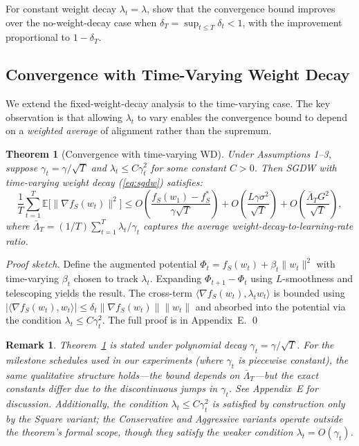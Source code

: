 \documentclass{article}
\newtheorem{theorem}{Theorem}
\newtheorem{remark}{Remark}
\begin{document}
For constant weight decay $\lambda_t = \lambda$, \citet{xie2024investigating} show
that the convergence bound improves over the no-weight-decay case when
$\delta_T = \sup_{t \leq T} \delta_t < 1$, with the improvement proportional to
$1 - \delta_T$.

\subsection{Convergence with Time-Varying Weight Decay}

We extend the fixed-weight-decay analysis to the time-varying case.
The key observation is that allowing $\lambda_t$ to vary enables the convergence
bound to depend on a \emph{weighted average} of alignment rather than the supremum.

\begin{theorem}[Convergence with time-varying WD]
  \label{thm:convergence}
  Under Assumptions 1--3, suppose $\gamma_t = \gamma / \sqrt{T}$ and
  $\lambda_t \leq C\gamma_t^2$ for some constant $C > 0$.
  Then SGDW with time-varying weight decay (\ref{eq:sgdw}) satisfies:
  \begin{equation}
    \frac{1}{T}\sum_{t=1}^{T} \mathbb{E}\bigl[\|\nabla f_S(w_t)\|^2\bigr]
    \leq O\!\left(\frac{f_S(w_1) - f_S^*}{\gamma\sqrt{T}}\right)
       + O\!\left(\frac{L\gamma\sigma^2}{\sqrt{T}}\right)
       + O\!\left(\frac{\bar{\Lambda}_T G^2}{\sqrt{T}}\right),
  \end{equation}
  where $\bar{\Lambda}_T = (1/T)\sum_{t=1}^{T} \lambda_t / \gamma_t$ captures the
  average weight-decay-to-learning-rate ratio.
\end{theorem}

\emph{Proof sketch.}
Define the augmented potential $\Phi_t = f_S(w_t) + \beta_t \|w_t\|^2$ with
time-varying $\beta_t$ chosen to track $\lambda_t$.
Expanding $\Phi_{t+1} - \Phi_t$ using $L$-smoothness and telescoping yields the
result.
The cross-term $\langle \nabla f_S(w_t), \lambda_t w_t \rangle$ is bounded using
$|\langle \nabla f_S(w_t), w_t \rangle| \leq \delta_t \|\nabla f_S(w_t)\| \|w_t\|$
and absorbed into the potential via the condition $\lambda_t \leq C\gamma_t^2$.
The full proof is in Appendix~E. \qed

\begin{remark}
  Theorem~\ref{thm:convergence} is stated under polynomial decay
  $\gamma_t = \gamma / \sqrt{T}$.
  For the milestone schedules used in our experiments (where $\gamma_t$ is
  piecewise constant), the same qualitative structure holds---the bound depends on
  $\bar{\Lambda}_T$---but the exact constants differ due to the discontinuous jumps
  in $\gamma_t$.
  See Appendix~E for discussion.
  Additionally, the condition $\lambda_t \leq C\gamma_t^2$ is satisfied by
  construction only by the Square variant; the Conservative and Aggressive variants
  operate outside the theorem's formal scope, though they satisfy the weaker condition
  $\lambda_t = O(\gamma_t)$.
\end{remark}
\end{document}
